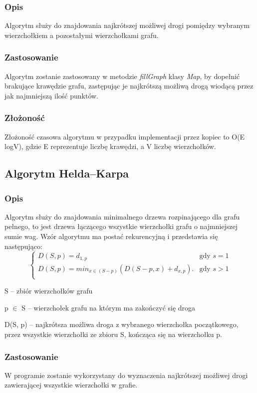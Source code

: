 \documentclass{article}
\begin{document}
\subsubsection{Opis}
Algorytm służy do znajdowania najkrótszej możliwej drogi pomiędzy wybranym wierzchołkiem a pozostałymi wierzchołkami grafu.
\subsubsection{Zastosowanie}
Algorytm zostanie zastosowany w metodzie \textit{fillGraph} klasy \textit{Map}, by dopełnić brakujące krawędzie grafu, zastępując je najkrótszą możliwą drogą wiodącą przez jak najmniejszą ilość punktów. 

\subsubsection{Złożoność}
Złożoność czasowa algorytmu w przypadku implementacji przez kopiec to O(E logV), gdzie E reprezentuje liczbę krawędzi, a V liczbę wierzchołków.

\subsection{Algorytm Helda--Karpa}

\subsubsection{Opis}
Algorytm służy do znajdowania minimalnego drzewa rozpinającego dla grafu pełnego, to jest drzewa łączącego wszystkie wierzchołki grafu o najmniejszej sumie wag. Wzór algorytmu ma postać rekurencyjną i przedstawia się następująco:\\
$$
\left\{ \begin{array}{ll}
D(S, p) = d_{1,p} & \textrm{gdy $s=1$}\\
D(S, p) = min_{x \in (S-{p})}( D(S-{p}, x) + d_{x,p}). & \textrm{gdy $s>1$}\\
\end{array} \right.
$$
    
S -- zbiór wierzchołków grafu
    
p $\in$ S -- wierzchołek grafu na którym ma zakończyć się droga
    
D(S, p) -- najkrótsza możliwa droga z wybranego wierzchołka początkowego, przez wszystkie wierzchołki ze zbioru S, kończąca się na wierzchołku p.

\subsubsection{Zastosowanie}
W programie zostanie wykorzystany do wyznaczenia najkrótszej możliwej drogi zawierającej wszystkie wierzchołki w grafie.
\end{document}
